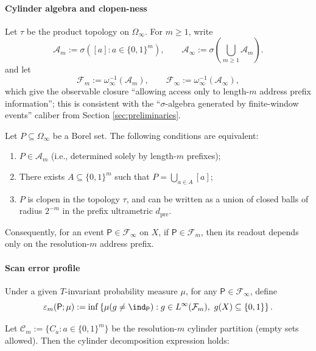 \paragraph{Cylinder algebra and clopen-ness}
Let $\tau$ be the product topology on $\Omega_\infty$. For $m\ge 1$, write
\[
\mathcal{A}_m:=\sigma([a]:a\in\{0,1\}^m),
\qquad
\mathcal{A}_\infty:=\sigma\!\left(\bigcup_{m\ge 1}\mathcal{A}_m\right).
\]
and let
\[
\mathcal{F}_m:=\omega_\infty^{-1}(\mathcal{A}_m),
\qquad
\mathcal{F}_\infty:=\omega_\infty^{-1}(\mathcal{A}_\infty),
\]
which give the observable closure ``allowing access only to length-$m$ address prefix information''; this is consistent with the ``$\sigma$-algebra generated by finite-window events'' caliber from Section \ref{sec:preliminaries}.

\begin{proposition}\label{prop:spg-decidable-clopen}
Let $P\subseteq\Omega_\infty$ be a Borel set. The following conditions are equivalent:
\begin{enumerate}
  \item $P\in\mathcal{A}_m$ (i.e., determined solely by length-$m$ prefixes);
  \item There exists $A\subseteq\{0,1\}^m$ such that $P=\bigcup_{a\in A}[a]$;
  \item $P$ is clopen in the topology $\tau$, and can be written as a union of closed balls of radius $2^{-m}$ in the prefix ultrametric $d_{\mathrm{pre}}$.
\end{enumerate}
Consequently, for an event $\mathsf P\in\mathcal{F}_\infty$ on $X$, if $\mathsf P\in\mathcal{F}_m$, then its readout depends only on the resolution-$m$ address prefix.
\end{proposition}

\paragraph{Scan error profile}
\begin{definition}\label{def:spg-scan-error-profile}
Under a given $T$-invariant probability measure $\mu$, for any $\mathsf P\in\mathcal{F}_\infty$, define
\[
\varepsilon_m(\mathsf P;\mu)
:=\inf\left\{\mu(g\neq \ind_{\mathsf P}): g\in L^\infty(\mathcal{F}_m),\ g(X)\subseteq\{0,1\}\right\}.
\]
\end{definition}

Let $\mathcal{C}_m:=\{C_a:a\in\{0,1\}^m\}$ be the resolution-$m$ cylinder partition (empty sets allowed). Then the cylinder decomposition expression holds:

